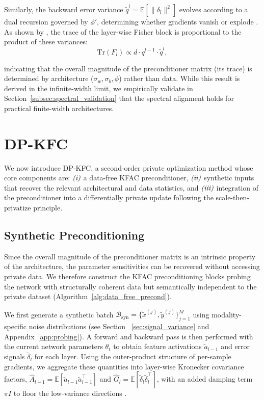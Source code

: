 \documentclass{article}
\theoremstyle{plain}
\theoremstyle{definition}
\theoremstyle{remark}
\begin{document}
Similarly, the backward error variance $\tilde{q}^l = \mathbb{E}[\|\delta_l\|^2]$ evolves according to a dual recursion governed by $\phi'$, determining whether gradients vanish or explode \cite{schoenholz2016deep}. As shown by \citet{karakida2019universal}, the trace of the layer-wise Fisher block is proportional to the product of these variances:
\begin{equation}
\label{eq:mft}
\mathrm{Tr}(F_l) \propto d \cdot q^{l-1} \cdot \tilde{q}^l,    
\end{equation}


indicating that the overall magnitude of the preconditioner matrix (its trace) is determined by architecture ($\sigma_w, \sigma_b, \phi$) rather than data. While this result is derived in the infinite-width limit, we empirically validate in Section~\ref{subsec:spectral_validation} that the spectral alignment holds for practical finite-width architectures.

\section{DP-KFC}

We now introduce DP-KFC, a second-order private optimization method whose core components are:
$\emph{(i)}$ a data-free KFAC preconditioner,
$\emph{(ii)}$ synthetic inputs that recover the relevant architectural and data statistics, and
$\emph{(iii)}$ integration of the preconditioner into a differentially private update following the scale-then-privatize principle.

\subsection{Synthetic Preconditioning}
\label{sec:noise_preconditioning}

Since the overall magnitude of the preconditioner matrix is an intrinsic property of the architecture, the parameter sensitivities can be recovered without accessing private data. We therefore construct the KFAC preconditioning blocks probing the network with structurally coherent data but semantically independent to the private dataset (Algorithm~\ref{alg:data_free_precond}). 

We first generate a synthetic batch $\mathcal{B}_{\text{syn}} = \{\tilde{x}^{(j)}, \tilde{y}^{(j)}\}_{j=1}^M $ using modality-specific noise distributions (see Section ~\ref{sec:signal_variance} and Appendix~\ref{app:probing}).
A forward and backward pass is then performed with the current network parameters $\theta_t$ to obtain feature activations
$\tilde{a}_{l-1}$ and error signals $\tilde{\delta}_l$ for each layer. Using the outer-product structure of per-sample gradients, we aggregate these quantities into layer-wise Kronecker
covariance factors,
$\hat{A}_{l-1} = \mathbb{E}[\tilde{a}_{l-1} \tilde{a}_{l-1}^\top]$ and
$\hat{G}_l = \mathbb{E}[\tilde{\delta}_l \tilde{\delta}_l^\top]$,
with an added damping term $\pi I$ to floor the low-variance directions \cite{DBLP:journals/corr/MartensG15}.
\end{document}
